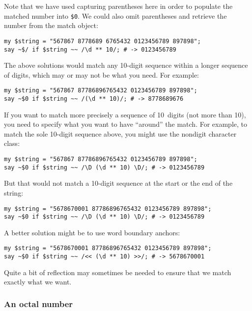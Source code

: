 Note that we have used capturing parentheses here in order 
to populate the matched number into \verb'$0'. We could also 
omit parentheses and retrieve the number from the match object:


\begin{verbatim}
my $string = "567867 8778689 6765432 0123456789 897898";
say ~$/ if $string ~~ /\d ** 10/; # -> 0123456789
\end{verbatim}
%

The above solutions would match any 10-digit sequence 
within a longer sequence of digits, which may or may not 
be what you need. For example:

\begin{verbatim}
my $string = "567867 87786896765432 0123456789 897898";
say ~$0 if $string ~~ /(\d ** 10)/; # -> 8778689676
\end{verbatim}

If you want to match more precisely a sequence of 10~digits 
(not more than 10), you need to specify what you 
want to have ``around'' the match. For example, to 
match the sole 10-digit sequence above, you might use 
the nondigit character class:

\begin{verbatim}
my $string = "567867 87786896765432 0123456789 897898";
say ~$0 if $string ~~ /\D (\d ** 10) \D/; # -> 0123456789
\end{verbatim}

But that would not match a 10-digit sequence at the start 
or the end of the string:

\begin{verbatim}
my $string = "5678670001 87786896765432 0123456789 897898";
say ~$0 if $string ~~ /\D (\d ** 10) \D/; # -> 0123456789
\end{verbatim}

A better solution might be to use word boundary anchors:

\begin{verbatim}
my $string = "5678670001 87786896765432 0123456789 897898";
say ~$0 if $string ~~ /<< (\d ** 10) >>/; # -> 5678670001
\end{verbatim}

Quite a bit of reflection may sometimes be needed to ensure 
that we match exactly what we want. 

\subsubsection{An octal number}

